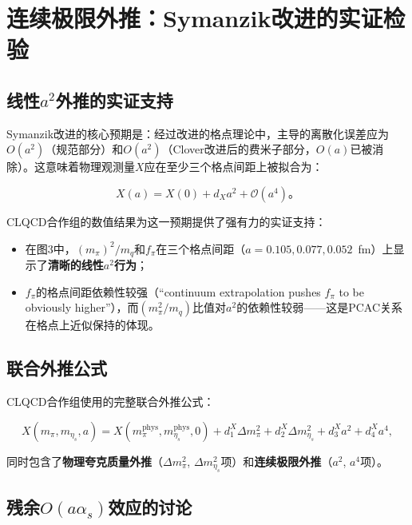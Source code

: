 \documentclass[12pt,a4paper]{ctexart}
\theoremstyle{definition}
\begin{document}
\section{连续极限外推：Symanzik改进的实证检验}

\subsection{线性$a^2$外推的实证支持}

Symanzik改进的核心预期是：经过改进的格点理论中，主导的离散化误差应为$O(a^2)$（规范部分）和$O(a^2)$（Clover改进后的费米子部分，$O(a)$已被消除）。这意味着物理观测量$X$应在至少三个格点间距上被拟合为：

\begin{equation}
\boxed{X(a) = X(0) + d_X a^2 + \mathcal{O}(a^4)}。
\label{eq:a2_extrap}
\end{equation}

CLQCD合作组的数值结果\cite{CLQCD2025quark_mass}为这一预期提供了强有力的实证支持：
\begin{itemize}
    \item 在图3中，$(m_\pi)^2/m_q$和$f_\pi$在三个格点间距（$a = 0.105, 0.077, 0.052$~fm）上显示了\textbf{清晰的线性$a^2$行为}；
    \item $f_\pi$的格点间距依赖性较强（``continuum extrapolation pushes $f_\pi$ to be obviously higher''），而$(m^2_\pi/m_q)$比值对$a^2$的依赖性较弱——这是PCAC关系在格点上近似保持的体现。
\end{itemize}

\subsection{联合外推公式}

CLQCD合作组\cite{CLQCD2024charm}使用的完整联合外推公式：

\begin{equation}
X(m_\pi, m_{\eta_s}, a) = X(m^{\text{phys}}_\pi, m^{\text{phys}}_{\eta_s}, 0) + d^X_1 \Delta m^2_\pi + d^X_2 \Delta m^2_{\eta_s} + d^X_3 a^2 + d^X_4 a^4,
\label{eq:joint_extrap}
\end{equation}

同时包含了\textbf{物理夸克质量外推}（$\Delta m^2_\pi$, $\Delta m^2_{\eta_s}$项）和\textbf{连续极限外推}（$a^2$, $a^4$项）。

\subsection{残余$O(a\alpha_s)$效应的讨论}
\end{document}
